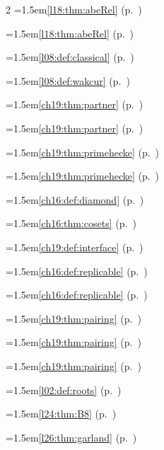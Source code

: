 \begin{multicols}{2}
\hangindent=1.5em\quad \ref{l18:thm:abeRel} (p.~\pageref{l18:thm:abeRel})\par
\hangindent=1.5em\quad \ref{l18:thm:abeRel} (p.~\pageref{l18:thm:abeRel})\par
\hangindent=1.5em\quad \ref{l08:def:classical} (p.~\pageref{l08:def:classical})\par
\hangindent=1.5em\quad \ref{l08:def:wakcur} (p.~\pageref{l08:def:wakcur})\par
\hangindent=1.5em\quad \ref{ch19:thm:partner} (p.~\pageref{ch19:thm:partner})\par
\hangindent=1.5em\quad \ref{ch19:thm:partner} (p.~\pageref{ch19:thm:partner})\par
\hangindent=1.5em\quad \ref{ch19:thm:primehecke} (p.~\pageref{ch19:thm:primehecke})\par
\hangindent=1.5em\quad \ref{ch19:thm:primehecke} (p.~\pageref{ch19:thm:primehecke})\par
\hangindent=1.5em\quad \ref{ch16:def:diamond} (p.~\pageref{ch16:def:diamond})\par
\hangindent=1.5em\quad \ref{ch16:thm:cosets} (p.~\pageref{ch16:thm:cosets})\par
\hangindent=1.5em\quad \ref{ch19:def:interface} (p.~\pageref{ch19:def:interface})\par
\hangindent=1.5em\quad \ref{ch16:def:replicable} (p.~\pageref{ch16:def:replicable})\par
\hangindent=1.5em\quad \ref{ch16:def:replicable} (p.~\pageref{ch16:def:replicable})\par
\hangindent=1.5em\quad \ref{ch19:thm:pairing} (p.~\pageref{ch19:thm:pairing})\par
\hangindent=1.5em\quad \ref{ch19:thm:pairing} (p.~\pageref{ch19:thm:pairing})\par
\hangindent=1.5em\quad \ref{ch19:thm:pairing} (p.~\pageref{ch19:thm:pairing})\par
\hangindent=1.5em\quad \ref{l02:def:roots} (p.~\pageref{l02:def:roots})\par
\hangindent=1.5em\quad \ref{l24:thm:B8} (p.~\pageref{l24:thm:B8})\par
\hangindent=1.5em\quad \ref{l26:thm:garland} (p.~\pageref{l26:thm:garland})\par

\end{multicols}

